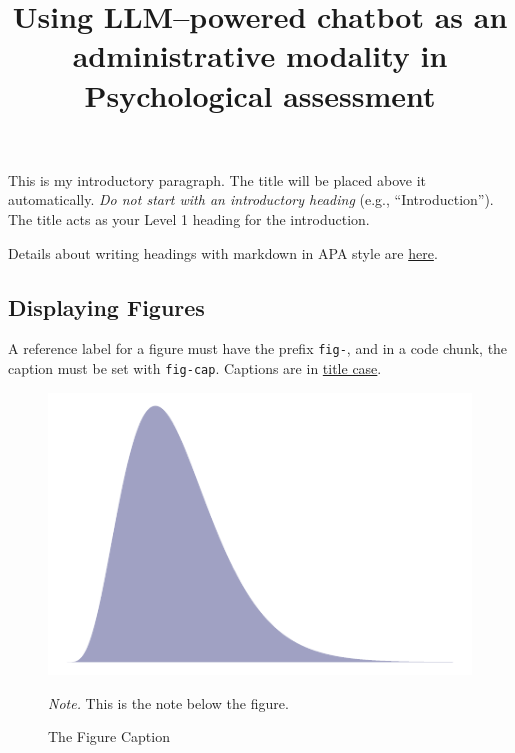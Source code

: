 \documentclass[
  jou,
  floatsintext,
  longtable,
  nolmodern,
  notxfonts,
  notimes,
  colorlinks=true,linkcolor=blue,citecolor=blue,urlcolor=blue]{apa7}
\title{Using LLM--powered chatbot as an administrative modality in
Psychological assessment}
\affiliation{
{Ana and Blanca's University}}
\begin{document}
\maketitle


\setcounter{secnumdepth}{-\maxdimen} %

\setlength\LTleft{0pt}


This is my introductory paragraph. The title will be placed above it
automatically. \emph{Do not start with an introductory heading} (e.g.,
``Introduction''). The title acts as your Level 1 heading for the
introduction.

Details about writing headings with markdown in APA style are
\href{https://wjschne.github.io/apaquarto/writing.html\#headings-in-apa-style}{here}.

\subsection{Displaying Figures}\label{displaying-figures}

A reference label for a figure must have the prefix \texttt{fig-}, and
in a code chunk, the caption must be set with \texttt{fig-cap}. Captions
are in
\href{https://apastyle.apa.org/style-grammar-guidelines/capitalization/title-case}{title
case}.

\begin{figure}[!htbp]

{\caption{{The Figure Caption}{\label{fig-myplot}}}}

\includegraphics{example_files/figure-pdf/fig-myplot-1.pdf}

{\noindent \emph{Note.} This is the note below the figure.}

\end{figure}
\end{document}
